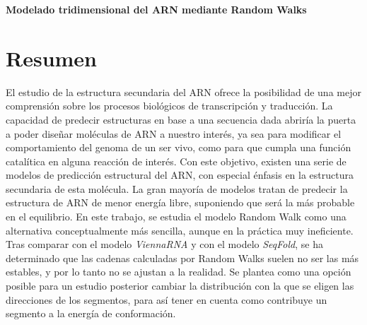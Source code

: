 \documentclass[a4paper,11pt,titlepage]{article}
\theoremstyle{definition}
\begin{document}

%
%
%
\newpage
{}

\phantom{hola}

\begin{center}
    \Large\centering\textbf{Modelado tridimensional del ARN mediante Random Walks}
\end{center}

\vspace{1cm}

\section*{Resumen}\label{sec:summary}

El estudio de la estructura secundaria del ARN ofrece la posibilidad de una mejor comprensión sobre los procesos biológicos de transcripción y traducción. La capacidad de predecir estructuras en base a una secuencia dada abriría la puerta a poder diseñar moléculas de ARN a nuestro interés, ya sea para modificar el comportamiento del genoma de un ser vivo, como para que cumpla una función catalítica en alguna reacción de interés. Con este objetivo, existen una serie de modelos de predicción estructural del ARN, con especial énfasis en la estructura secundaria de esta molécula. La gran mayoría de modelos tratan de predecir la estructura de ARN de menor energía libre, suponiendo que será la más probable en el equilibrio. En este trabajo, se estudia el modelo Random Walk como una alternativa conceptualmente más sencilla, aunque en la práctica muy ineficiente. Tras comparar con el modelo \textit{ViennaRNA} y con el modelo \textit{SeqFold}, se ha determinado que las cadenas calculadas por Random Walks suelen no ser las más estables, y por lo tanto no se ajustan a la realidad. Se plantea como una opción posible para un estudio posterior cambiar la distribución con la que se eligen las direcciones de los segmentos, para así tener en cuenta como contribuye un segmento a la energía de conformación.

\vspace{1cm}
\end{document}
